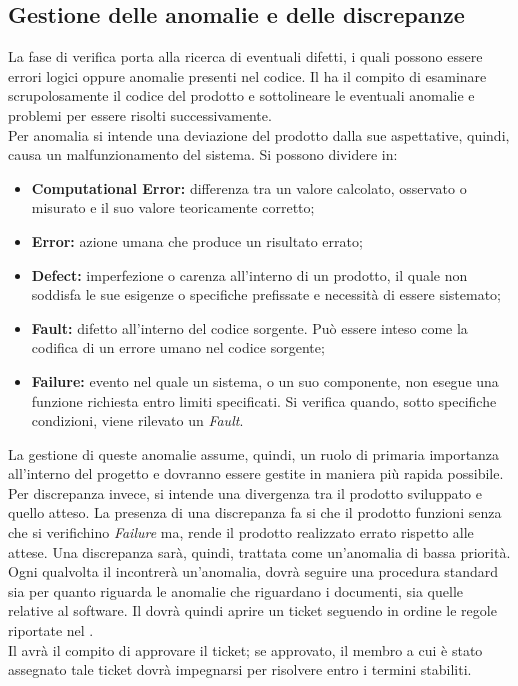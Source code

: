 	\subsection{Gestione delle anomalie e delle discrepanze}
	La fase di verifica porta alla ricerca di eventuali difetti, i quali possono essere errori logici oppure anomalie presenti nel codice. Il \roleVerifier{} ha il compito di esaminare scrupolosamente il codice del prodotto e sottolineare le eventuali anomalie e problemi per essere risolti successivamente.\\
	Per anomalia si intende una deviazione del prodotto dalla sue aspettative, quindi, causa un malfunzionamento del sistema. Si possono dividere in:
	\begin{itemize}
		\item \textbf{Computational Error:} differenza tra un valore calcolato, osservato o misurato e il suo valore teoricamente corretto;
		\item \textbf{Error:} azione umana che produce un risultato errato;
		\item \textbf{Defect:} imperfezione o carenza all'interno di un prodotto, il quale non soddisfa le sue esigenze o specifiche prefissate e necessità di essere sistemato;
		\item \textbf{Fault:} difetto all'interno del codice sorgente. Può essere inteso come la codifica di un errore umano nel codice sorgente;
		\item \textbf{Failure:} evento nel quale un sistema, o un suo componente, non esegue una funzione richiesta entro limiti specificati. Si verifica quando, sotto specifiche condizioni, viene rilevato un \emph{Fault}.
	\end{itemize}
	La gestione di queste anomalie assume, quindi, un ruolo di primaria importanza all'interno del progetto e dovranno essere gestite in maniera più rapida possibile.\\
	Per discrepanza invece, si intende una divergenza tra il prodotto sviluppato e quello atteso. La presenza di una discrepanza fa si che il prodotto funzioni senza che si verifichino \emph{Failure} ma, rende il prodotto realizzato errato rispetto alle attese. Una discrepanza sarà, quindi, trattata come un'anomalia di bassa priorità.\\
	Ogni qualvolta il \roleVerifier{} incontrerà un'anomalia, dovrà seguire una procedura standard sia per quanto riguarda le anomalie che riguardano i documenti, sia quelle relative al software. Il \roleVerifier{} dovrà quindi aprire un ticket seguendo in ordine le regole riportate nel \docNameVersionNdP.\\
	Il \roleProjectManager{} avrà il compito di approvare il ticket; se approvato, il membro a cui è stato assegnato tale ticket dovrà impegnarsi per risolvere entro i termini stabiliti.
	
